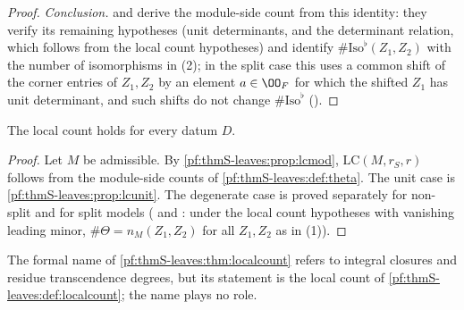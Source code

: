 \begin{proof}
\emph{Conclusion.}  and 
derive the module-side count from this identity: they verify its remaining hypotheses (unit determinants, and the determinant
relation, which follows from the local count hypotheses) and identify $\#\mathrm{Iso}^\flat(Z_1,Z_2)$ with the number of isomorphisms in (2);
in the split case this uses a common shift of the corner entries of $Z_1,Z_2$ by an element $a\in\OO_F$ for which the shifted $Z_1$ has
unit determinant, and such shifts do not change $\#\mathrm{Iso}^\flat$
().
\end{proof}
\begin{theorem}\label{pf:thmS-leaves:thm:localcount}
The local count holds for every datum $D$.
\end{theorem}

\begin{proof}
Let $M$ be admissible. By \cref{pf:thmS-leaves:prop:lcmod}, $\mathrm{LC}(M,r_S,r)$ follows from the module-side counts of
\cref{pf:thmS-leaves:def:theta}. The unit case is \cref{pf:thmS-leaves:prop:lcunit}. The degenerate case is proved separately
for non-split and for split models ( and :
under the local count hypotheses with vanishing leading minor, $\#\Theta=n_M(Z_1,Z_2)$ for all $Z_1,Z_2$ as in (1)).
\end{proof}

\begin{remark}\label{pf:thmS-leaves:rem:t2name}
The formal name of \cref{pf:thmS-leaves:thm:localcount} refers to integral closures and residue transcendence degrees, but its
statement is the local count of \cref{pf:thmS-leaves:def:localcount}; the name plays no role.
\end{remark}

